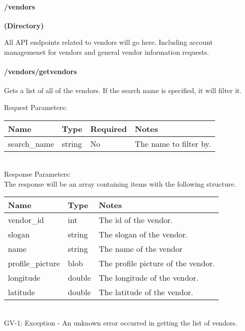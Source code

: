 \documentclass{article}[11pt]
\begin{document}
\newpage

\paragraph{/vendors}\textbf{ (Directory) }

All API endpoints related to vendors will go here. Including account managemenet for vendors and general vendor information requests.

\paragraph{/vendors/getvendors}\textbf{}

Gets a list of all of the vendors. If the search name is specified, it will filter it.

\noindent
Request Parameters:

\noindent
\begin{tabular}{|l|l|l|l|}
\hline
\textbf{Name} & \textbf{Type} & \textbf{Required} & \textbf{Notes} \\
\hline
search\_name & string & No & The name to filter by. \\
\hline
\end{tabular} \\

\noindent
Response Parameters: \\

\noindent
The response will be an array containing items with the following structure.

\noindent
\begin{tabular}{|l|l|l|}
\hline
\textbf{Name} & \textbf{Type} & \textbf{Notes} \\
\hline
vendor\_id & int & The id of the vendor. \\
slogan & string & The slogan of the vendor. \\
name & string & The name of the vendor \\
profile\_picture & blob & The profile picture of the vendor. \\
longitude & double & The longitude of the vendor. \\
latitude & double & The latitude of the vendor. \\
\hline
\end{tabular} \\

\ErrorsSession
GV-1: Exception - An unknown error occurred in getting the list of vendors. \\
\end{document}
